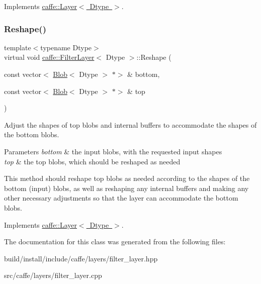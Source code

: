 Implements \mbox{\hyperlink{classcaffe_1_1_layer_a7fe981e8af8d93d587acf2a952be563d}{caffe\+::\+Layer$<$ Dtype $>$}}.

\mbox{\label{classcaffe_1_1_filter_layer_aea626ef6cdd51ca2ede31319daab2d1b}} 
\subsubsection{\texorpdfstring{Reshape()}{Reshape()}\hspace{0.1cm}{\footnotesize\ttfamily [2/2]}}
{\footnotesize\ttfamily template$<$typename Dtype$>$ \\
virtual void \mbox{\hyperlink{classcaffe_1_1_filter_layer}{caffe\+::\+Filter\+Layer}}$<$ Dtype $>$\+::Reshape (\begin{DoxyParamCaption}\item[{const vector$<$ \mbox{\hyperlink{classcaffe_1_1_blob}{Blob}}$<$ Dtype $>$ $\ast$$>$ \&}]{bottom,  }\item[{const vector$<$ \mbox{\hyperlink{classcaffe_1_1_blob}{Blob}}$<$ Dtype $>$ $\ast$$>$ \&}]{top }\end{DoxyParamCaption})\hspace{0.3cm}{\ttfamily [virtual]}}



Adjust the shapes of top blobs and internal buffers to accommodate the shapes of the bottom blobs. 


\begin{DoxyParams}{Parameters}
{\em bottom} & the input blobs, with the requested input shapes \\
\hline
{\em top} & the top blobs, which should be reshaped as needed\\
\hline
\end{DoxyParams}
This method should reshape top blobs as needed according to the shapes of the bottom (input) blobs, as well as reshaping any internal buffers and making any other necessary adjustments so that the layer can accommodate the bottom blobs. 

Implements \mbox{\hyperlink{classcaffe_1_1_layer_a7fe981e8af8d93d587acf2a952be563d}{caffe\+::\+Layer$<$ Dtype $>$}}.



The documentation for this class was generated from the following files\+:\begin{DoxyCompactItemize}
\item 
build/install/include/caffe/layers/filter\+\_\+layer.\+hpp\item 
src/caffe/layers/filter\+\_\+layer.\+cpp\end{DoxyCompactItemize}
